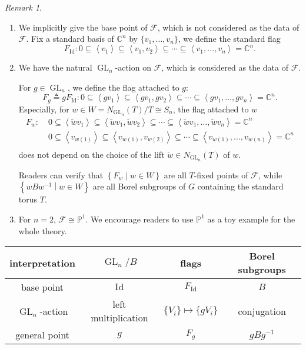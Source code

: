 \documentclass[reqno,11pt]{book}
\numberwithin{equation}{section}
\theoremstyle{plain}
\theoremstyle{plain}
\numberwithin{equation}{section}
\theoremstyle{remark}
\newtheorem{remark}[theorem]{Remark}
\DeclareMathOperator{\GL}{\operatorname{GL}}
\DeclareMathOperator{\Id}{\operatorname{Id}}
\begin{document}
\begin{remark}\
\begin{enumerate}
\item We implicitly give the base point of $\mathcal{F}$, which is not considered as the data of $\mathcal{F}$. Fix a standard basis of $\mathbb{C}^n$ by $\{v_1, \ldots, v_n \}$, we define the standard flag
$$F_{\Id}: 0 \subseteq \left< v_1 \right> \subseteq \left< v_1,v_2 \right> \subseteq \cdots \subseteq \left< v_1, \ldots, v_n \right> = \mathbb{C}^n.$$
\item We have the natural $\GL_n$-action on $\mathcal{F}$, which is considered as the data of $\mathcal{F}$.

For $g \in \GL_n$, we define the flag attached to $g$: 
$$F_g \triangleq gF_{\Id}: 0 \subseteq \left< gv_1 \right> \subseteq \left< gv_1,gv_2 \right> \subseteq \cdots \subseteq \left< gv_1, \ldots, gv_n \right> = \mathbb{C}^n.$$
Especially, for $w \in W=N_{\GL_n}(T)/T \cong S_n$, the flag attached to $w$
\begin{equation*}
\begin{aligned}
  F_w:\;&  0 \subseteq \left< \tilde{w}v_1 \right> \subseteq \left< \tilde{w}v_1,\tilde{w}v_2 \right> \subseteq \cdots \subseteq \left< \tilde{w}v_1, \ldots, \tilde{w}v_n \right> = \mathbb{C}^n\\ 
  &  0 \subseteq \left< v_{w(1)} \right> \subseteq \left< v_{w(1)},v_{w(2)} \right> \subseteq \cdots \subseteq \left< v_{w(1)}, \ldots, v_{w(n)} \right> = \mathbb{C}^n\\
\end{aligned}
\end{equation*}
does not depend on the choice of the lift $\tilde{w} \in N_{\GL_n}(T)$ of $w$.

Readers can verify that $\left\{ F_w \middle| w \in W \right\}$ are all $T$-fixed points of $\mathcal{F}$, while $\left\{ wBw^{-1} \middle| w \in W \right\}$ are all Borel subgroups of $G$ containing the standard torus $T$.
\item For $n=2$, $\mathcal{F} \cong \mathbb{P}^1$. We encourage readers to use $\mathbb{P}^1$ as a toy example for the whole theory.
\end{enumerate}
\end{remark}
\begin{table}[ht]
\centering
\begin{tabular}{|c|c|c|c|}
\hline
interpretation & $\GL_n/B$           & flags                       & Borel subgroups \\ \hline
base point     & $\Id$               & $F_{\Id}$                   & $B$             \\ \hline
$\GL_n$-action & left multiplication & $\{V_i\} \mapsto \{gV_i \}$ & conjugation     \\ \hline
general point  & $g$                 & $F_g$                       & $gBg^{-1}$      \\ \hline
\end{tabular}
\end{table}
        
\end{document}
